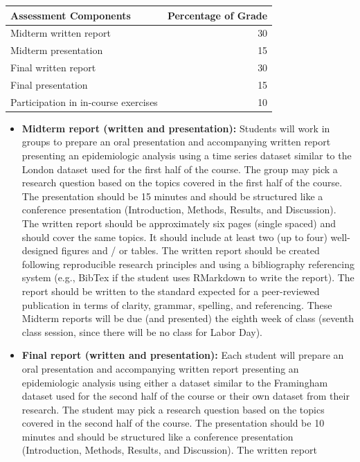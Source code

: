 \documentclass[
]{book}
\providecommand{\tightlist}{%
  \setlength{\itemsep}{0pt}\setlength{\parskip}{0pt}}
\begin{document}
\begin{tabular}{l|r}
\hline
Assessment Components & Percentage of Grade\\
\hline
Midterm written report & 30\\
\hline
Midterm presentation & 15\\
\hline
Final written report & 30\\
\hline
Final presentation & 15\\
\hline
Participation in in-course exercises & 10\\
\hline
\end{tabular}

\begin{itemize}
\tightlist
\item
  \textbf{Midterm report (written and presentation):} Students will work in groups to prepare an oral presentation and accompanying written report presenting an epidemiologic
  analysis using a time series dataset similar to the London dataset used
  for the first half of the course. The group may pick a research question
  based on the topics covered in the first half of the course. The presentation
  should be 15 minutes and should be structured like a conference presentation
  (Introduction, Methods, Results, and Discussion). The written report
  should be approximately six pages (single spaced) and should cover the
  same topics. It should include at least two (up to four) well-designed figures and / or
  tables. The written report should be created following reproducible
  research principles and using a bibliography referencing system (e.g.,
  BibTex if the student uses RMarkdown to write the report). The report
  should be written to the standard expected for a peer-reviewed
  publication in terms of clarity, grammar, spelling, and referencing.
  These Midterm reports will be due (and presented) the eighth week of class
  (seventh class session, since there will be no class for Labor Day).
\item
  \textbf{Final report (written and presentation):} Each student will prepare an oral presentation and accompanying written report presenting an epidemiologic
  analysis using either a dataset similar to the Framingham dataset used
  for the second half of the course or their own dataset from their research. The student may pick a research question
  based on the topics covered in the second half of the course. The presentation
  should be 10 minutes and should be structured like a conference presentation
  (Introduction, Methods, Results, and Discussion). The written report

\end{itemize}
\end{document}
